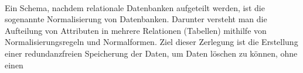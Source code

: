 \\ 
Ein Schema, nachdem relationale Datenbanken aufgeteilt werden, ist die sogenannte Normalisierung von Datenbanken. Darunter versteht man die 
Aufteilung von Attributen in mehrere Relationen (Tabellen) mithilfe von Normalisierungsregeln und Normalformen. \cite{normalisierung.2020j} 
Ziel dieser Zerlegung ist die Erstellung einer redundanzfreien Speicherung der Daten, um Daten löschen zu können, ohne einen 

